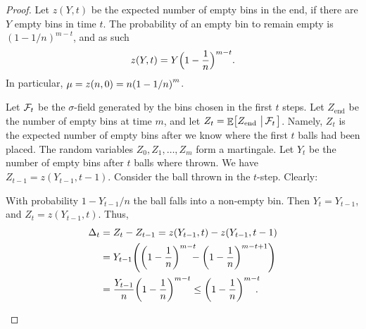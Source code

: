 \begin{proof}
    Let $z(Y,t)$ be the expected number of empty bins in the end, if
    there are $Y$ empty bins in time $t$. The probability of an empty
    bin to remain empty is $(1-1/n)^{m-t}$, and as such
    \begin{align*}
      z(Y,t) = Y  \Bigl( 1-\frac{1}{n} \Bigr)^{m-t}.
    \end{align*}
    In particular, $\mu = z(n, 0) = n \pth[]{1-\nfrac{1}{n}}^m$.

    \smallskip

    Let $\mathcal{F}_t$ be the $\sigma$-field generated by the bins chosen
    in the first $t$ steps. Let $Z_{\textrm{end}}$ be the number of
    empty bins at time $m$, and let $Z_t = \mathop{\mathbb{E}}\!\left[ {Z_{\textrm{end}}
       \,\left|\, {\mathcal{F}_t} \bigr.\right.} \right]$. Namely, $Z_t$ is the expected number of
    empty bins after we know where the first $t$ balls had been
    placed.  The random variables $Z_0, Z_1, \ldots, Z_m$ form a
    martingale.  Let $Y_t$ be the number of empty bins after $t$ balls
    where thrown. We have $Z_{t-1} = z(Y_{t-1},t-1)$.  Consider the
    ball thrown in the $t$-step. Clearly:
    \smallskip%
    \begin{compactenumA}
        \item With probability $1 - Y_{t-1}/n$ the ball falls
        into a non-empty bin. Then $Y_t= Y_{t-1}$, and $Z_t
        = z(Y_{t-1},t)$. Thus,
        \begin{align*}
          \Delta_t%
          &=%
            Z_t - Z_{t-1} = z(Y_{t-1},t) - z(Y_{t-1},t-1)%
            \\&
            =%
            Y_{t-1} \pth[]{ \pth{1-\frac{1}{n}}^{m-t}\!\!\!\! -
            \pth[]{1-\frac{1}{n}}^{m-t+1}}%
          \\&%
          =%
          \frac{Y_{t-1}}{n}\pth{1-\frac{1}{n}}^{m-t}%
          \leq%
          \pth{1-\frac{1}{n}}^{m-t} \!\!\!.
        \end{align*}


\end{compactenumA}
\end{proof}
